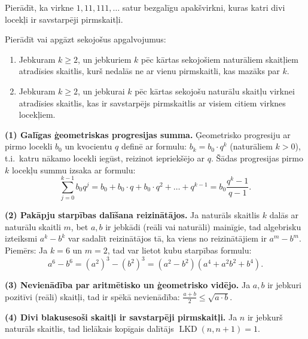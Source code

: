 \documentclass[a4paper,12pt]{article}
\begin{document}
\vspace{20pt}
\begin{problem}
Pierādīt, ka virkne $1,11,111,\ldots$ satur bezgalīgu apakšvirkni,
kuras katri divi locekļi ir savstarpēji pirmskaitļi.
\end{problem}



\vspace{20pt}
\begin{problem}
Pierādīt vai apgāzt sekojošus apgalvojumus:
\begin{enumerate}
\item Jebkuram $k \geq 2$, un jebkuriem $k$ pēc kārtas sekojošiem naturāliem 
skaitļiem atradīsies skaitlis, kurš nedalās ne ar vienu pirmskaitli, kas mazāks par $k$.   
\item Jebkuram $k \geq 2$, un jebkurai $k$ pēc kārtas sekojošu naturālu skaitļu virknei atradīsies skaitlis, kas ir savstarpējs pirmskaitlis ar visiem citiem virknes locekļiem. 
\end{enumerate}
\end{problem}

\newpage


{\bf (1) Galīgas ģeometriskas progresijas summa.} Ģeometrisko progresiju ar pirmo locekli $b_0$ 
un kvocientu $q$ definē ar formulu: $b_k = b_0 \cdot q^k$ (naturāliem $k>0$), t.i.\ katru nākamo locekli 
iegūst, reizinot iepriekšējo ar $q$. Šādas progresijas pirmo $k$ locekļu summu izsaka ar formulu:
$$\sum\limits_{j=0}^{k-1} b_0 q^j = b_0 + b_0 \cdot q + b_0 \cdot q^2 + \ldots + q^{k-1} = b_0 \frac{q^k-1}{q-1}.$$

{\bf (2) Pakāpju starpības dalīšana reizinātājos.} 
Ja naturāls skaitlis $k$ dalās ar naturālu skaitli $m$, bet $a,b$ ir jebkādi (reāli vai naturāli) mainīgie, 
tad algebrisku izteiksmi $a^k - b^k$ var sadalīt reizinātājos tā, ka viens no reizinātājiem ir $a^m - b^m$.\\
Piemērs: Ja $k = 6$ un $m=2$, tad var lietot kubu starpības formulu:
$$a^6 - b^6 = (a^2)^3 - (b^2)^3 = \left(a^2 - b^2\right)\left(a^4 + a^2b^2 + b^4\right).$$

{\bf (3) Nevienādība par aritmētisko un ģeometrisko vidējo.}
Ja $a,b$ ir jebkuri pozitīvi (reāli) skaitļi, tad ir spēkā nevienādība:
${\displaystyle \frac{a+b}{2} \leq \sqrt{a \cdot b}}$.

{\bf (4) Divi blakusesoši skaitļi ir savstarpēji pirmskaitļi.}
Ja $n$ ir jebkurš naturāls skaitlis, tad lielākais kopīgais dalītājs $\operatorname{LKD}(n,n+1) = 1$.
\end{document}
